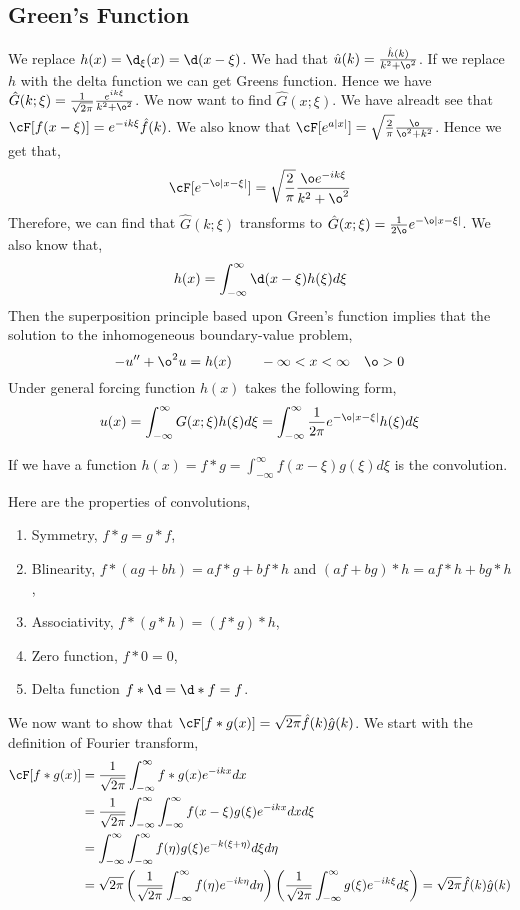 \subsection{Green's Function}
We replace $h(x) = \d_\xi(x) = \d (x - \xi)$. We had that $\hat u(k) = \frac{\hat h(k)}{k^2 + \o^2}$. If we replace $h$ with the delta function we can get Greens function. Hence we have $\hat G(k; \xi) = \frac{1}{\sqrt{2\pi}}\frac{e^{ik\xi}}{k^2 + \o^2}$. We now want to find $\hat G(x; \xi)$. We have alreadt see that $\cF[ f(x - \xi)] = e^{-ik\xi}\hat f(k)$.
We also know that $\cF [ e^{a|x|}] = \sqrt{\frac{2}{\pi}}\frac{\o}{\o^2 + k^2}$. Hence we get that,
$$ \cF[ e^{-\o|x - \xi|}] = \sqrt{\frac{2}{\pi}} \frac{\o e^{-ik\xi}}{k^2 + \o^2} $$
Therefore, we can find that $\hat G(k; \xi)$ transforms to $\hat G(x; \xi) = \frac{1}{2\o} e^{-\o|x - \xi|}$. We also know that,
$$ h(x) = \int_{-\infty}^\infty \d(x - \xi)h(\xi)d\xi $$
Then the superposition principle based upon Green's function implies that the solution to the inhomogeneous boundary-value problem,
$$ -u'' + \o^2 u = h(x) \qquad -\infty < x < \infty \quad \o > 0$$
Under general forcing function $h(x)$ takes the following form,
$$ u(x) = \int_{-\infty}^\infty G(x; \xi)h(\xi) d\xi = \int_{-\infty}^\infty \frac{1}{2\pi} e^{-\o|x - \xi|}h(\xi)d\xi$$

\begin{ndefi}[Convolution]
  If we have a function $h(x) = f * g = \int_{-\infty}^\infty f(x - \xi)g(\xi)d\xi $ is the convolution.
\end{ndefi}
Here are the properties of convolutions,
\begin{enumerate}
  \item Symmetry, $f * g = g * f$,
  \item Blinearity, $f * (ag + bh) = af*g + bf*h$ and $(af + bg)*h = af*h + bg*h$,
  \item Associativity, $f * (g * h) = (f * g) * h$,
  \item Zero function, $f * 0 = 0$,
  \item Delta function $f * \d = \d * f = f$.
\end{enumerate}

We now want to show that $\cF [f * g (x)] = \sqrt{2\pi} \hat f (k) \hat g (k)$. We start with the definition of Fourier transform,
\begin{align*}
  \cF[f * g (x)] &= \frac{1}{\sqrt{2\pi}}\int_{-\infty}^\infty f * g(x) e^{-ikx}dx \\
  &= \frac{1}{\sqrt{2\pi}}\int_{-\infty}^\infty \int_{-\infty}^\infty f(x - \xi)g(\xi) e^{-ikx} dx d\xi \\
  &= \int_{-\infty}^\infty \int_{-\infty}^\infty f(\eta)g(\xi) e^{-k(\xi + \eta)}d\xi d\eta \\
  &= \sqrt{2\pi} \left( \frac{1}{\sqrt{2\pi}}\int_{-\infty}^\infty f(\eta) e^{-ik\eta}d\eta\right)\left( \frac{1}{\sqrt{2\pi}}\int_{-\infty}^\infty g(\xi) e^{-ik\xi}d\xi \right) = \sqrt{2\pi}\hat f(k)\hat g(k)
\end{align*}

